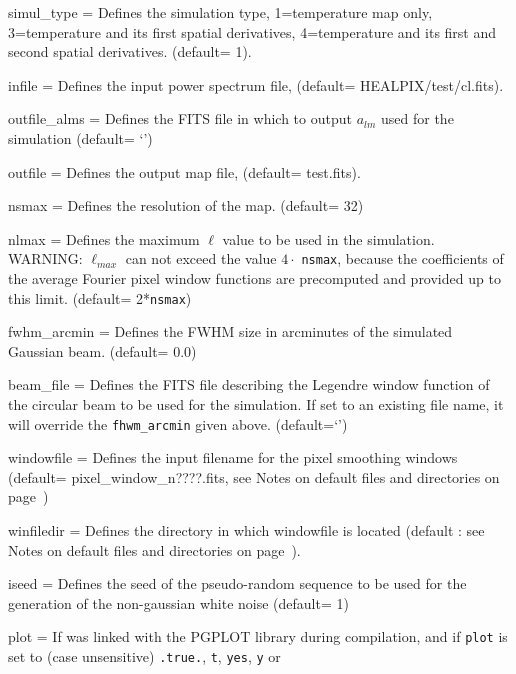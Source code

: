 \begin{qualifiers}
  \begin{qulistwide}{} %
     \item[{simul\_type = }] Defines the simulation type, 1=temperature map only,
       3=temperature and its first spatial derivatives,
       4=temperature and its first and second spatial derivatives.
(default= 1).
    \item[{infile = }] Defines the input power spectrum file,
	(default= HEALPIX/test/cl.fits).
%
    \item[{outfile\_alms = }] Defines the FITS file in which to output $a_{lm}$ used
      for the simulation (default= `')
%
    \item[{outfile = }] Defines the output map file, (default= test.fits).
%
    \item[{nsmax = }] Defines the resolution of the map.
(default= 32)
%
     \item[{nlmax = }] Defines the maximum $\ell$ value 
to be used in the simulation. WARNING: $\ell_{max}$ can not exceed
the value $4\cdot$ {\tt nsmax}, because the coefficients of the  average Fourier 
pixel window functions
are precomputed and provided up to this limit.
(default= 2*{\tt nsmax})
%
    \item[{fwhm\_arcmin = }] Defines the FWHM size in arcminutes 
of the simulated Gaussian beam.
(default= 0.0)
%
    \item[{beam\_file = }] Defines the FITS file describing the
    Legendre window
    function of the circular beam to be used for the
    simulation. If set to an existing file name, it will override the
    {\tt fhwm\_arcmin} given above. (default=`')
%
     \item[{windowfile = }] Defines the input filename  for the pixel
    smoothing windows 
(default= pixel\_window\_n????.fits, see Notes on default files and directories
on page~\pageref{page:defdir})
%
     \item[{winfiledir = }] Defines the directory in which windowfile
    is located (default : see Notes on default files and directories on
page~\pageref{page:defdir}).
%
      \item[{iseed = }] Defines the seed of the pseudo-random sequence to be used 
for the generation of the non-gaussian white noise (default= 1)
%
     \item[{plot =}] If \thedocid was linked with the PGPLOT library during compilation, and
if {\tt plot} is set to (case unsensitive) {\tt .true.}, {\tt t}, {\tt yes}, {\tt y}  or

\end{qulistwide}
\end{qualifiers}
